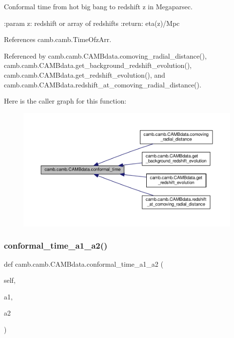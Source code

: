 \begin{DoxyVerb}Conformal time from hot big bang to redshift z in Megaparsec.

:param z: redshift or array of redshifts
:return: eta(z)/Mpc
\end{DoxyVerb}
 

References camb.\+camb.\+Time\+Ofz\+Arr.



Referenced by camb.\+camb.\+C\+A\+M\+Bdata.\+comoving\+\_\+radial\+\_\+distance(), camb.\+camb.\+C\+A\+M\+Bdata.\+get\+\_\+background\+\_\+redshift\+\_\+evolution(), camb.\+camb.\+C\+A\+M\+Bdata.\+get\+\_\+redshift\+\_\+evolution(), and camb.\+camb.\+C\+A\+M\+Bdata.\+redshift\+\_\+at\+\_\+comoving\+\_\+radial\+\_\+distance().

Here is the caller graph for this function\+:
\nopagebreak
\begin{figure}[H]
\begin{center}
\leavevmode
\includegraphics[width=350pt]{classcamb_1_1camb_1_1CAMBdata_a6d9d95cf253bf830576f17763ecc9faa_icgraph}
\end{center}
\end{figure}
\mbox{\label{classcamb_1_1camb_1_1CAMBdata_a9cd584b66e9c6b2cbbbce97eacf6a721}} 
\subsubsection{\texorpdfstring{conformal\+\_\+time\+\_\+a1\+\_\+a2()}{conformal\_time\_a1\_a2()}}
{\footnotesize\ttfamily def camb.\+camb.\+C\+A\+M\+Bdata.\+conformal\+\_\+time\+\_\+a1\+\_\+a2 (\begin{DoxyParamCaption}\item[{}]{self,  }\item[{}]{a1,  }\item[{}]{a2 }\end{DoxyParamCaption})}


